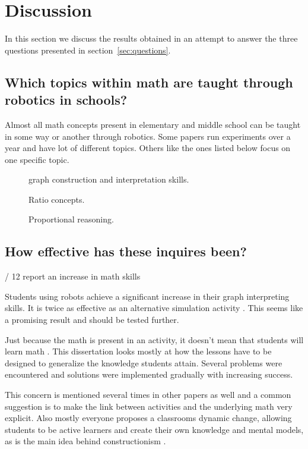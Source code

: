 \section*{Discussion}
In this section we discuss the results obtained in an attempt to answer the three questions presented in section~\ref{sec:questions}.

\subsection*{Which topics within math are taught through robotics in schools?}

Almost all math concepts present in elementary and middle school can be taught in some way or another through robotics. Some papers run experiments over a year and have lot of different topics. Others like the ones listed below focus on one specific topic.

\begin{description}
	\item [] graph construction and interpretation skills.
	\item [] Ratio concepts. 
	\item [] Proportional reasoning.
\end{description}

\subsection*{How effective has these inquires been?}

\bigskip{} / 12 report an increase in math skills

\bigskip\noindent
Students using robots achieve a significant increase in their graph interpreting skills. It is twice as effective as an alternative simulation activity . This seems like a promising result and should be tested further. 

\bigskip\noindent
Just because the math is present in an activity, it doesn't mean that students will learn math . This dissertation looks mostly at how the lessons have to be designed to generalize the knowledge students attain. Several problems were encountered and solutions were implemented gradually with increasing success.

\bigskip\noindent
This concern is mentioned several times in other papers as well and a common suggestion is to make the link between activities and the underlying math very explicit. Also mostly everyone proposes a classrooms dynamic change, allowing students to be active learners and create their own knowledge and mental models, as is the main idea behind constructionism \cite{papert1980mindstorms}.


